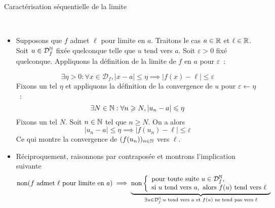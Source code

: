 \documentclass{article}
\renewenvironment{question_kholle}[2][ ]
{
	\subsection{\texorpdfstring{#2}{}}
	\notblank{#1}
	{
		\noindent #1
		\bigbreak
	}
	{}
	\begin{proof}
}
{
	\end{proof}
}
\begin{document}
\begin{question_kholle}{Caractérisation séquentielle de la limite}

	\hfill\\
	\begin{itemize}[label=$\star$]
		\item Supposons que $f$ admet $\ell$ pour limite en $a$. Traitons le cas $a \in \mathbb R$ et $\ell \in \mathbb R$.
		      Soit $u \in \mathcal{D}_{f}^{\mathbb N}$ fixée quelconque telle que $u$ tend vers $a$.
		      Soit $\varepsilon>0$ fixé quelconque. Appliquons la définition de la limite de $f$ en $a$ pour $\varepsilon$~:

		      $$
			      \exists \eta >0 : \forall x \in \mathcal{D}_{f}, \lvert x - a \rvert \leqslant \eta \implies \lvert f(x) - \ell \rvert  \leqslant \varepsilon
		      $$
		      Fixons un tel $\eta$ et appliquons la définition de la convergence de $u$ pour $\varepsilon \leftarrow \eta$~:
		      $$
			      \exists N \in \mathbb N : \forall n \geqslant N, \lvert u_{n} - a \rvert  \leqslant \eta
		      $$
		      Fixons un tel $N$.
		      Soit $n \in \mathbb N$ tel que $n \geqslant N$.
		      On a alors
		      $$
			      \lvert u_{n} - a \rvert  \leqslant \eta \implies \lvert f(u_{n}) - \ell \rvert \leqslant \varepsilon
		      $$
		      Ce qui montre la convergence de $(f(u_{n}))_{n \in \mathbb N}$ vers $\ell$.

		\item Réciproquement, raisonnons par contraposée et montrons l'implication suivante
		      $$
			      \mathrm{non}(f \text{ admet }\ell \text{ pour limite en }a) \implies \underbrace{ \mathrm{non} \left\{ \begin{array}{ll}
					      \text{pour toute suite } u \in \mathcal{D}_{f}^{\mathbb N}, \\
					      \text{si } u \text{ tend vers } a, \text{ alors } f(u) \text{ tend vers } \ell
				      \end{array}\right. }_{ \exists u \in \mathcal{D}_{f}^{\mathbb N} : u \text{ tend vers }a \text{ et } f(u) \text{ ne tend pas vers }\ell }
		      $$


\end{itemize}
\end{question_kholle}
\end{document}
